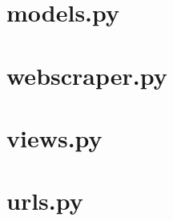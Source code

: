 \section{models.py}\label{code:models.py}

\section{webscraper.py}\label{code:webscraper.py}

\section{views.py}\label{code:views.py}

\section{urls.py}\label{code:urls.py}

